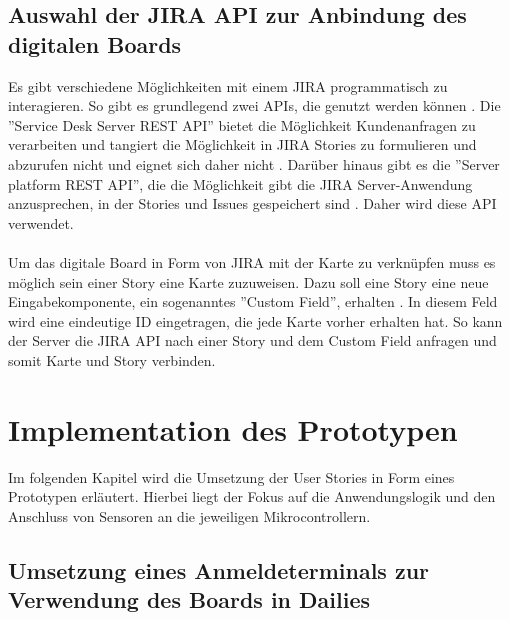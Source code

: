 \documentclass[12pt,titlepage]{scrartcl}
\begin{document}
		\subsection{Auswahl der JIRA API zur Anbindung des digitalen Boards} \label{decideJira}
		Es gibt verschiedene Möglichkeiten mit einem JIRA programmatisch zu interagieren. So gibt es grundlegend zwei APIs, die genutzt werden können \cite{jiraapi}. Die ''Service Desk Server REST API'' bietet die Möglichkeit Kundenanfragen zu verarbeiten und tangiert die Möglichkeit in JIRA Stories zu formulieren und abzurufen nicht und eignet sich daher nicht \cite{jiraserviceapi}. Darüber hinaus gibt es die ''Server platform REST API'', die die Möglichkeit gibt die JIRA Server-Anwendung anzusprechen, in der Stories und Issues gespeichert sind \cite{jiraserverapi}. Daher wird diese API verwendet.\\ \\
		Um das digitale Board in Form von JIRA mit der Karte zu verknüpfen muss es möglich sein einer Story eine Karte zuzuweisen. Dazu soll eine Story eine neue Eingabekomponente, ein sogenanntes ''Custom Field'', erhalten \cite{jiracustomfield}. In diesem Feld wird eine eindeutige ID eingetragen, die jede Karte vorher erhalten hat. So kann der Server die JIRA API nach einer Story und dem Custom Field anfragen und somit Karte und Story verbinden. 
	\newpage
	\section{Implementation des Prototypen} \label{impl}
	Im folgenden Kapitel wird die Umsetzung der User Stories in Form eines Prototypen erläutert. Hierbei liegt der Fokus auf die Anwendungslogik und den Anschluss von Sensoren an die jeweiligen Mikrocontrollern.
		\subsection{Umsetzung eines Anmeldeterminals zur Verwendung des Boards in Dailies}
\end{document}
